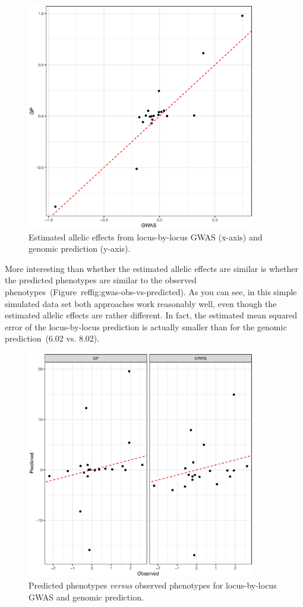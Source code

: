 \documentclass[12pt]{article}
\begin{document}
\begin{figure}
  \begin{center}
    \includegraphics[width=10cm]{gwas-vs-gp.eps}
  \end{center}
  \caption{Estimated allelic effects from locus-by-locus GWAS (x-axis)
    and genomic prediction (y-axis).}\label{fig:gwas-vs-gp}
\end{figure}

More interesting than whether the estimated allelic effects are
similar is whether the predicted phenotypes are similar to the
observed phenotypes~(Figure~ref{fig:gwas-obs-vs-predicted}). As you
can see, in this simple simulated data set both approaches work
reasonably well, even though the estimated allelic effects are rather
different. In fact, the estimated mean squared error of the
locus-by-locus prediction is actually smaller than for the genomic
prediction~(6.02 vs. 8.02).

\begin{figure}
  \begin{center}
    \includegraphics[width=10cm]{gwas-obs-vs-predicted.eps}
  \end{center}
  \caption{Predicted phenotypes {\it versus\/} observed phenotypes for
    locus-by-locus GWAS and genomic prediction.}\label{fig:gwas-obs-vs-predicted}
\end{figure}




\ccLicense
\end{document}
